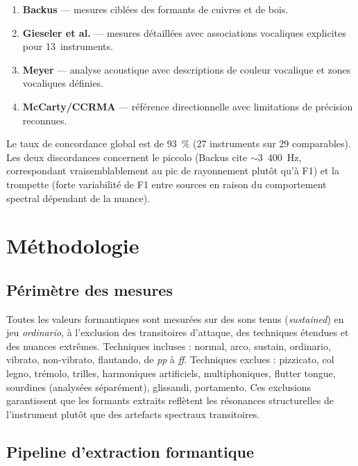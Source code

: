 \documentclass[12pt,a4paper]{article}
\begin{document}
\begin{enumerate}
\item \textbf{Backus} \citep{Backus1969} --- mesures ciblées des formants de cuivres
et de bois.
\item \textbf{Gieseler et al.} \citep{Gieseler1985} --- mesures détaillées avec
associations vocaliques explicites pour 13~instruments.
\item \textbf{Meyer} \citep{Meyer2009} --- analyse acoustique avec descriptions de
couleur vocalique et zones vocaliques définies.
\item \textbf{McCarty/CCRMA} \citep{McCarty2003} --- référence directionnelle avec
limitations de précision reconnues.
\end{enumerate}

Le taux de concordance global est de 93~\% (27 instruments sur 29 comparables). Les
deux discordances concernent le piccolo (Backus cite $\sim$3~400~Hz, correspondant
vraisemblablement au pic de rayonnement plutôt qu'à F1) et la trompette (forte
variabilité de F1 entre sources en raison du comportement spectral dépendant de la
nuance).

\section{Méthodologie}
\label{sec:methodology}

\subsection{Périmètre des mesures}

Toutes les valeurs formantiques sont mesurées sur des sons tenus (\emph{sustained})
en jeu \emph{ordinario}, à l'exclusion des transitoires d'attaque, des techniques
étendues et des nuances extrêmes. Techniques incluses : normal, arco, sustain,
ordinario, vibrato, non-vibrato, flautando, de \emph{pp} à \emph{ff}. Techniques
exclues : pizzicato, col legno, trémolo, trilles, harmoniques artificiels, multiphoniques,
flutter tongue, sourdines (analysées séparément), glissandi, portamento. Ces exclusions
garantissent que les formants extraits reflètent les résonances structurelles de
l'instrument plutôt que des artefacts spectraux transitoires.

\subsection{Pipeline d'extraction formantique}
\end{document}

